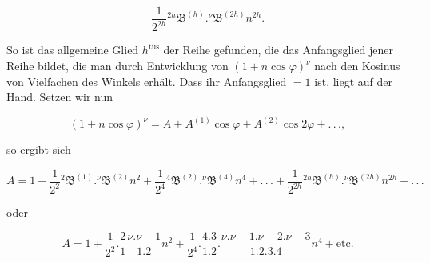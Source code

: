 \[
\frac{1}{2^{2h}} {}^{2h}\mathfrak{B}^{(h)}  .  {}^{\nu}\mathfrak{B}^{(2h)} n^{2h}.
\]

\noindent So ist das allgemeine Glied $h^{\text{tus}}$ der Reihe gefunden, die das Anfangsglied jener Reihe bildet, die man durch Entwicklung von $(1+n\cos\varphi)^{\nu}$ nach den Kosinus von Vielfachen des Winkels erhält. Dass ihr Anfangsglied $=1$ ist, liegt auf der Hand. Setzen wir nun

\[
(1+n\cos\varphi)^{\nu} = A + A^{(1)}\cos\varphi + A^{(2)}\cos 2\varphi + .\,.\,.,
\]

\noindent so ergibt sich

\[
A = 1 + \frac{1}{2^{2}} {}^{2}\mathfrak{B}^{(1)}  .  {}^{\nu}\mathfrak{B}^{(2)} n^{2} + \frac{1}{2^{4}} {}^{4}\mathfrak{B}^{(2)}  .  {}^{\nu}\mathfrak{B}^{(4)} n^{4} + .\,.\,. + \frac{1}{2^{2h}} {}^{2h}\mathfrak{B}^{(h)}  .  {}^{\nu}\mathfrak{B}^{(2h)} n^{2h} + .\,.\,.
\]

\noindent oder

\[
A = 1 + \frac{1}{2^{2}}  .  \frac{2}{1} \frac{\nu.\nu-1}{1.2} n^{2} + \frac{1}{2^{4}}  .  \frac{4.3}{1.2}  .  \frac{\nu.\nu-1.\nu-2.\nu-3}{1.2.3.4} n^{4} + \text{etc.}
\]
